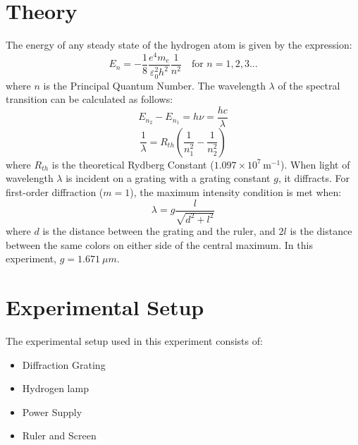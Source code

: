 \documentclass[journal]{IEEEtran}
\begin{document}
\section{Theory}
The energy of any steady state of the hydrogen atom is given by the expression:
\begin{equation}
    E_n = -\frac{1}{8} \frac{e^4 m_e}{\varepsilon_0^2 h^2} \frac{1}{n^2} \quad \text{for } n = 1,2,3 \dots
\end{equation}
where $n$ is the Principal Quantum Number. The wavelength $\lambda$ of the spectral transition can be calculated as follows:
\begin{equation}
    E_{n_2} - E_{n_1} = h \nu = \frac{hc}{\lambda}
\end{equation}
\begin{equation}
    \frac{1}{\lambda} = R_{th} \left( \frac{1}{n_1^2} - \frac{1}{n_2^2} \right)
    \label{eq:rydberg}
\end{equation}
where $R_{th}$ is the theoretical Rydberg Constant ($1.097 \times 10^7 \, \mathrm{m^{-1}}$).
When light of wavelength $\lambda$ is incident on a grating with a grating constant $g$, it diffracts. For first-order diffraction ($m=1$), the maximum intensity condition is met when:
\begin{equation}
    \lambda = g \frac{l}{\sqrt{d^2 + l^2}}
    \label{eq:wavelength}
\end{equation}
where $d$ is the distance between the grating and the ruler, and $2l$ is the distance between the same colors on either side of the central maximum. In this experiment, $g = \SI{1.671}{\mu m}$.

\section{Experimental Setup}
The experimental setup used in this experiment consists of:
\begin{itemize}
    \item Diffraction Grating
    \item Hydrogen lamp 
    \item Power Supply
    \item Ruler and Screen
\end{itemize}

\end{document}
